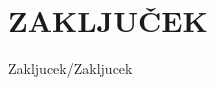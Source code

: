 \documentclass[12pt,a4paper,titlepage,openany,twoside]{report}
\begin{document}
\chapter{ZAKLJUČEK}\label{sec:zakljucek}
\thispagestyle{fancy} 
{Zakljucek/Zakljucek}



%
%
%
%
%
%
%
%
%
%
%
%
%
%
\end{document}
